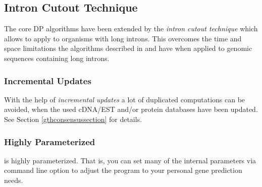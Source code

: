\documentclass[11pt,a4paper,titlepage]{article}
\begin{document}
\subsection*{Intron Cutout Technique}
The core DP algorithms have been extended by the \emph{intron cutout technique} \cite{GRE:BRE:SPA:KUR:2005} which allows to apply \Gth to organisms with long introns.
This overcomes the time and space limitations the algorithms described in \cite{USU:ZHU:BRE:2000} and \cite{USU:BRE:2000} have when applied to genomic sequences containing long introns.

\subsubsection*{Incremental Updates}
With the help of \emph{incremental updates} a lot of duplicated computations can be avoided, when the used cDNA/EST and/or protein databases have been updated. See Section \ref{gthconsensussection} for details.

\subsubsection*{Highly Parameterized}
\Gth is highly parameterized. That is, you can set many of the internal parameters via command line option to adjust the program to your personal gene prediction needs.



\end{document}
